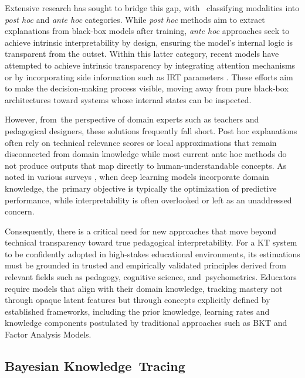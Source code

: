 \documentclass[applsci,article,accept,moreauthors,pdftex]{Definitions/mdpi}
\begin{document}
{Extensive research has sought to bridge this gap, with~{\citet{bai2024survey}} classifying modalities into {\textit{post hoc}} and {\textit{ante hoc}} categories.}
{While {\textit{post hoc}} methods aim to extract explanations from black-box models after training, {\textit{ante hoc}} approaches seek to achieve intrinsic interpretability by design, ensuring the model's internal logic is transparent from the outset.}
{Within this latter category, recent models have attempted to achieve intrinsic transparency by integrating attention mechanisms {\citep{Pandey2019384, ghosh2020context}} or by incorporating side information such as IRT parameters {\citep{yeung2019deep, su2021time, chen2023improving}}.}
{These efforts aim to make the decision-making process visible, moving away from pure black-box architectures toward systems whose internal states can be inspected.}

{However, from~the perspective of domain experts such as teachers and pedagogical designers, these solutions frequently fall short.}
{Post hoc explanations often rely on technical relevance scores or local approximations that remain disconnected from domain knowledge {\citep{rudin2019stop}} while most current ante hoc methods do not produce outputs that map directly to human-understandable concepts.}
{As noted in various surveys {\citep{bai2024survey, vonrueden2021informed}}, when deep learning models incorporate domain knowledge, the~primary objective is typically the optimization of predictive performance, while interpretability is often overlooked or left as an unaddressed concern.}

{Consequently, there is a critical need for new approaches that move beyond technical transparency toward true pedagogical interpretability.}
{For a KT system to be confidently adopted in high-stakes educational environments, its estimations must be grounded in trusted and empirically validated principles derived from relevant fields such as pedagogy, cognitive science, and~psychometrics.}
{Educators require models that align with their domain knowledge, tracking mastery not through opaque latent features but through concepts explicitly defined by established frameworks, including the prior knowledge, learning rates and knowledge components postulated by traditional approaches such as BKT and Factor Analysis Models.}

\subsection{Bayesian Knowledge~Tracing} \label{sec_bkt}
\end{document}
